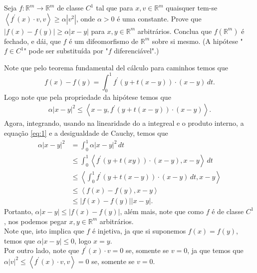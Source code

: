 \begin{homeworkProblem}[Seção 1-7]
  Seja $f:\mathbb{R}^{m}\to\mathbb{R}^{m}$ de classe $C^{1}$ tal que para $x,v\in\mathbb{R}^{m}$ quaisquer tem-se $\left\langle f^{\prime}(x)\cdot v,v \right\rangle\geq \alpha \left| v^{2} \right|$, onde $\alpha>0$ é uma constante. Prove que $|f(x)-f(y)|\geq \alpha\left| x-y\right|$ para $x,y\in\mathbb{R}^{m}$ arbitrários. Conclua que $f\left( \mathbb{R}^{m} \right)$ é fechado, e dái, que $f$ é um difeomorfismo de $\mathbb{R}^{m}$ sobre si mesmo. (A hipótese "$f\in C^{1}$" pode ser substituída por "$f$ diferenciável".) 
  \begin{solution}
    Note que pelo teorema fundamental del cálculo para caminhos temos que
    \begin{equation}\label{eq:1}
      f(x)-f(y)=\int_{0}^{1}f^{\prime}(y+t(x-y))\cdot (x-y)\,dt.
    \end{equation}
    Logo note que pela propriedade da hipótese temos que 
    \begin{align*}
      \alpha\left| x-y \right|^{2}\leq \left\langle x-y,f^{\prime}(y+t(x-y))\cdot (x-y) \right\rangle.
    \end{align*}
    Agora, integrando, usando na linearidade do a integreal e o produto interno, a equação \eqref{eq:1} e a desigualdade de Cauchy, temos que
    \begin{align*}
      \alpha\left| x-y \right|^{2}&=\int_{0}^{1}\alpha\left| x-y \right|^{2}\,dt\\
      &\leq \int_{0}^{1}\left\langle f^{\prime}(y+t(xy))\cdot(x-y),x-y \right\rangle\,dt\\
      &\leq \left\langle \int_{0}^{1}f^{\prime}(y+t(x-y))\cdot (x-y)\,dt ,x-y\right\rangle\\
      &\leq \left\langle f(x)-f(y),x-y \right\rangle\\
      &\leq \left| f(x)-f(y) \right|\left| x-y \right|.
    \end{align*}
    Portanto, $\alpha\left| x-y \right|\leq \left| f(x)-f(y) \right|$, além mais, note que como $f$ é de classe $C^{1}$, nos podemos pegar $x,y\in\mathbb{R}^{m}$ arbitrários.\\
    Note que, isto implica que $f$ é injetiva, ja que si suponemos $f(x)=f(y)$, temos que $\alpha\left| x-y \right|\leq 0$, logo $x=y$.\\
    Por outro lado, note que $f^{\prime}(x)\cdot v=0$ se, somente se $v=0$, ja que temos que $\alpha\left| v \right|^{2}\leq \left\langle f^{\prime}(x)\cdot v,v \right\rangle=0$ se, somente se $v=0$.\\

\end{solution}
\end{homeworkProblem}
